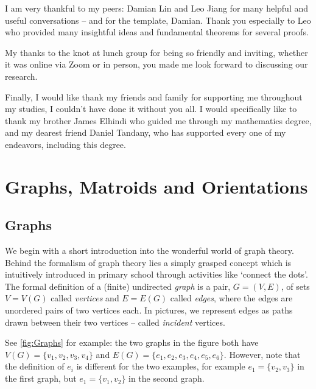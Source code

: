 \documentclass[12pt]{report}
\theoremstyle{definition}
\theoremstyle{upright}
\begin{document}
I am very thankful to my peers: Damian Lin and Leo Jiang for many helpful and useful conversations -- and for the template, Damian.
Thank you especially to Leo who provided many insightful ideas and fundamental theorems for several proofs.

My thanks to the knot at lunch group for being so friendly and inviting, whether it was online via Zoom or in person, you made me look forward to discussing our research.

Finally, I would like thank my friends and family for supporting me throughout my studies, I couldn't have done it without you all.
I would specifically like to thank my brother James Elhindi who guided me through my mathematics degree, and my dearest friend Daniel Tandany, who has supported every one of my endeavors, including this degree.

\newpage

\chapter{Graphs, Matroids and Orientations}
\label{chap:Graphs&Matroids}

\section{Graphs}
\label{sec:Graphs}

We begin with a short introduction into the wonderful world of graph theory.
Behind the formalism of graph theory lies a simply grasped concept which is intuitively introduced in primary school through activities like `connect the dots'.
The formal definition of a (finite) undirected \textit{graph} is a pair, $G=(V, E)$, of sets $V=V(G)$ called \textit{vertices} and $E=E(G)$ called \textit{edges}, where the edges are unordered pairs of two vertices each.
In pictures, we represent edges as paths drawn between their two vertices -- called \textit{incident} vertices.

See \cref{fig:Graphs} for example: the two graphs in the figure both have $V(G)=\{v_1, v_2, v_3, v_4\}$ and $E(G)=\{e_1, e_2, e_3, e_4, e_5, e_6\}$.
However, note that the definition of $e_i$ is different for the two examples, for example $e_1=\{v_2, v_3\}$ in the first graph, but $e_1=\{v_1, v_2\}$ in the second graph.
\end{document}
